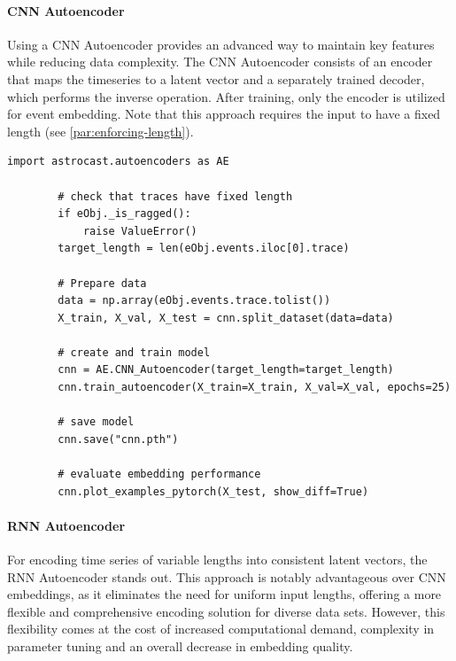 \documentclass[utf8]{FrontiersinHarvard}
\begin{document}
    \paragraph{\ac{CNN} Autoencoder}

    Using a \ac{CNN} Autoencoder provides an advanced way to maintain key features while reducing data complexity. The CNN Autoencoder consists of an encoder that maps the timeseries to a latent vector and a separately trained decoder, which performs the inverse operation. After training, only the encoder is utilized for event embedding. Note that this approach requires the input to have a fixed length (see \ref{par:enforcing-length}).

    \begin{lstlisting}[style=pyStyle]
        import astrocast.autoencoders as AE

        # check that traces have fixed length
        if eObj._is_ragged():
            raise ValueError()
        target_length = len(eObj.events.iloc[0].trace)

        # Prepare data
        data = np.array(eObj.events.trace.tolist())
        X_train, X_val, X_test = cnn.split_dataset(data=data)

        # create and train model
        cnn = AE.CNN_Autoencoder(target_length=target_length)
        cnn.train_autoencoder(X_train=X_train, X_val=X_val, epochs=25)

        # save model
        cnn.save("cnn.pth")

        # evaluate embedding performance
        cnn.plot_examples_pytorch(X_test, show_diff=True)
    \end{lstlisting}

    \paragraph{\ac{RNN} Autoencoder}

    For encoding time series of variable lengths into consistent latent vectors, the \ac{RNN} Autoencoder stands out. This approach is notably advantageous over CNN embeddings, as it eliminates the need for uniform input lengths, offering a more flexible and comprehensive encoding solution for diverse data sets. However, this flexibility comes at the cost of increased computational demand, complexity in parameter tuning and an overall decrease in embedding quality.
\end{document}
